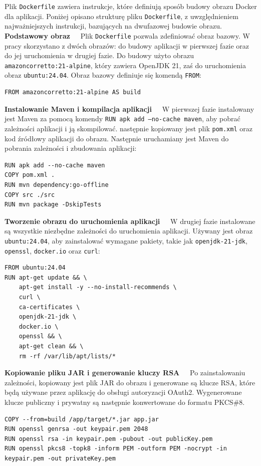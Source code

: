 Plik \texttt{Dockerfile} zawiera instrukcje, które definiują sposób budowy obrazu Docker dla aplikacji. Poniżej opisano strukturę pliku \texttt{Dockerfile}, z uwzględnieniem najważniejszych instrukcji, bazujących na dwufazowej budowie obrazu.\\[-10pt]

\noindent \textbf{Podstawowy obraz~~}
Plik \texttt{Dockerfile} pozwala zdefiniować obraz bazowy. W pracy skorzystano z dwóch obrazów: do budowy aplikacji w pierwszej fazie oraz do jej uruchomienia w drugiej fazie. Do budowy użyto obrazu \texttt{amazoncorretto:21-alpine}, który zawiera OpenJDK 21, zaś do uruchomienia obraz \texttt{ubuntu:24.04}. Obraz bazowy definiuje się komendą \texttt{FROM}:
\begin{lstlisting}[basicstyle=\footnotesize\ttfamily]
FROM amazoncorretto:21-alpine AS build
\end{lstlisting}

\noindent \textbf{Instalowanie Maven i kompilacja aplikacji~~}
W pierwszej fazie instalowany jest Maven za pomocą komendy \texttt{RUN apk add --no-cache maven}, aby pobrać zależności aplikacji i ją skompilować. następnie kopiowany jest plik \texttt{pom.xml} oraz kod źródłowy aplikacji do obrazu. Następnie uruchamiany jest Maven do pobrania zależności i zbudowania aplikacji:
\begin{lstlisting}[basicstyle=\footnotesize\ttfamily]
RUN apk add --no-cache maven
COPY pom.xml .
RUN mvn dependency:go-offline
COPY src ./src
RUN mvn package -DskipTests
\end{lstlisting}

\noindent \textbf{Tworzenie obrazu do uruchomienia aplikacji~~}
W drugiej fazie instalowane są wszystkie niezbędne zależności do uruchomienia aplikacji. Używany jest obraz \texttt{ubuntu:24.04}, aby zainstalować wymagane pakiety, takie jak \texttt{openjdk-21-jdk}, \texttt{openssl}, \texttt{docker.io} oraz \texttt{curl}:
\begin{lstlisting}[basicstyle=\footnotesize\ttfamily]
FROM ubuntu:24.04
RUN apt-get update && \
    apt-get install -y --no-install-recommends \
    curl \
    ca-certificates \
    openjdk-21-jdk \
    docker.io \
    openssl && \
    apt-get clean && \
    rm -rf /var/lib/apt/lists/*
\end{lstlisting}

\noindent \textbf{Kopiowanie pliku JAR i generowanie kluczy RSA~~}
Po zainstalowaniu zależności, kopiowany jest plik JAR do obrazu i generowane są klucze RSA, które będą używane przez aplikację do obsługi autoryzacji OAuth2. Wygenerowane klucze publiczny i prywatny są następnie konwertowane do formatu PKCS\#8.
\begin{lstlisting}[basicstyle=\footnotesize\ttfamily]
COPY --from=build /app/target/*.jar app.jar
RUN openssl genrsa -out keypair.pem 2048
RUN openssl rsa -in keypair.pem -pubout -out publicKey.pem
RUN openssl pkcs8 -topk8 -inform PEM -outform PEM -nocrypt -in keypair.pem -out privateKey.pem
\end{lstlisting}


